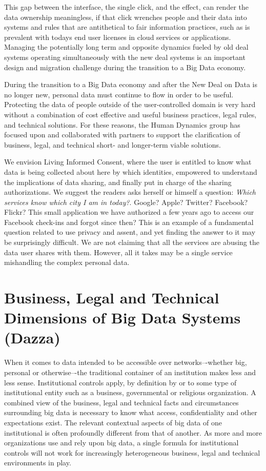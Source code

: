 This gap between the interface, the single click, and the effect, can render the data ownership meaningless, if that click wrenches people and their data into systems and rules that are antithetical to fair information practices, such as is prevalent with todays end user licenses in cloud services or applications.
Managing the potentially long term and opposite dynamics fueled by old deal systems operating simultaneously with the new deal systems is an important design and migration challenge during the transition to a Big Data economy.

During the transition to a Big Data economy and after the New Deal on Data is no longer new, personal data must continue to flow in order to be useful.
Protecting the data of people outside of the user-controlled domain is very hard without a combination of cost effective and useful business practices, legal rules, and technical solutions.
For these reasons, the Human Dynamics group has focused upon and collaborated with partners to support the clarification of business, legal, and technical short- and longer-term viable solutions.

We envision Living Informed Consent, where the user is entitled to know what data is being collected about here by which identities, empowered to understand the implications of data sharing, and finally put in charge of the sharing authorizations.
We suggest the readers asks herself or himself a question: \emph{Which services know which city I am in today?}.
Google? Apple? Twitter? Facebook? Flickr?
This small application we have authorized a few years ago to access our Facebook check-ins and forgot since then? 
This is an example of a fundamental question related to use privacy and assent, and yet finding the answer to it may be surprisingly difficult.
We are not claiming that all the services are abusing the data user shares with them.
However, all it takes may be a single service mishandling the complex personal data.



\section{Business, Legal and Technical Dimensions of Big Data Systems (Dazza)}

When it comes to data intended to be accessible over networks–-whether big, personal or otherwise–-the traditional container of an institution makes less and less sense.
Institutional controls apply, by definition by or to some type of institutional entity such as a business, governmental or religious organization.
A combined view of the business, legal and technical facts and circumstances surrounding big data is necessary to know what access, confidentiality and other expectations exist.
The relevant contextual aspects of big data of one institutional is often profoundly different from that of another.
As more and more organizations use and rely upon big data, a single formula for institutional controls will not work for increasingly heterogeneous business, legal and technical environments in play.

